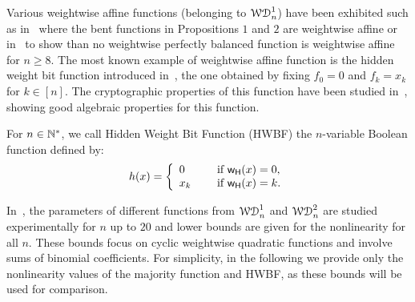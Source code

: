 \documentclass[11pt]{llncs}
\begin{document}
Various weightwise affine functions (\ie belonging to $\mathcal{WD}^{1}_{n}$) have been exhibited such as in~\cite{TOSC:CarMeaRot17} where the bent functions in Propositions $1$ and $2$ are weightwise affine or in~\cite{DAM:GinMea22} to show than no weightwise perfectly balanced function is weightwise affine for $n\ge 8$. 
The most known example of weightwise affine function is the hidden weight bit function introduced in~\cite{IEEE:Bryant91}, the one obtained by fixing $f_0=0$ and $f_k=x_k$ for $k \in [n]$. The cryptographic properties of this function have been studied in~\cite{DAM:WCST14}, showing good algebraic properties for this function.

\begin{definition}\label{def:hwbf}
	For $n\in \mathbb{N}^*$, we call Hidden Weight Bit Function (HWBF) the $n$-variable Boolean function defined by:
	\[h(x)= \left\{ 
	\begin{array}{l l}
	0 & \quad \text{ if } \mathsf{w_H}(x) =0, \\
	x_k & \quad \text{ if } \mathsf{w_H}(x)=k.
	\end{array} \right. \] 

\end{definition}

In~\cite{DAM:MeaOza24}, the parameters of different functions from $\mathcal{WD}^{1}_{n}$ and $\mathcal{WD}^{2}_{n}$ are studied experimentally for $n$ up to $20$ and lower bounds are given for the nonlinearity for all $n$. 
These bounds focus on cyclic weightwise quadratic functions and involve sums of binomial coefficients. For simplicity, in the following we provide only the nonlinearity values of the majority function and HWBF, as these bounds will be used for comparison.

\end{document}
